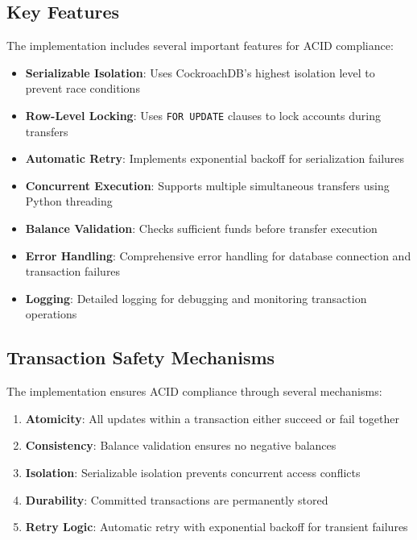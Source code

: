 \subsection{Key Features}

The implementation includes several important features for ACID compliance:

\begin{itemize}
    \item \textbf{Serializable Isolation}: Uses CockroachDB's highest isolation level to prevent race conditions
    \item \textbf{Row-Level Locking}: Uses \texttt{FOR UPDATE} clauses to lock accounts during transfers
    \item \textbf{Automatic Retry}: Implements exponential backoff for serialization failures
    \item \textbf{Concurrent Execution}: Supports multiple simultaneous transfers using Python threading
    \item \textbf{Balance Validation}: Checks sufficient funds before transfer execution
    \item \textbf{Error Handling}: Comprehensive error handling for database connection and transaction failures
    \item \textbf{Logging}: Detailed logging for debugging and monitoring transaction operations
\end{itemize}

\subsection{Transaction Safety Mechanisms}

The implementation ensures ACID compliance through several mechanisms:

\begin{enumerate}
    \item \textbf{Atomicity}: All updates within a transaction either succeed or fail together
    \item \textbf{Consistency}: Balance validation ensures no negative balances
    \item \textbf{Isolation}: Serializable isolation prevents concurrent access conflicts
    \item \textbf{Durability}: Committed transactions are permanently stored
    \item \textbf{Retry Logic}: Automatic retry with exponential backoff for transient failures
\end{enumerate}


